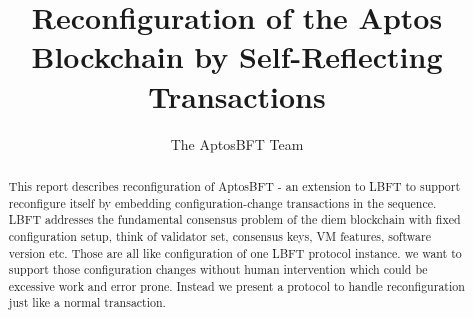 \documentclass[letterpaper,10pt]{article}
\newcommand{\LBFT}{LBFT\xspace}
\begin{document}
\title{Reconfiguration of the Aptos Blockchain by Self-Reflecting Transactions}
\author{The AptosBFT Team}
\date{}
\maketitle


\newcommand{\myomit}[1]{}

\begin{abstract}
This report describes reconfiguration of AptosBFT - an extension to \LBFT to support reconfigure itself
 by embedding configuration-change transactions in the sequence.
\LBFT addresses the fundamental consensus problem of the diem blockchain with fixed configuration setup,
think of validator set, consensus keys, VM features, software version etc.
Those are all like configuration of one \LBFT protocol instance. we want to support those configuration changes
without human intervention which could be excessive work and error prone. Instead we present
a protocol to handle reconfiguration just like a normal transaction.
\end{abstract}






\begingroup


\endgroup
\end{document}
